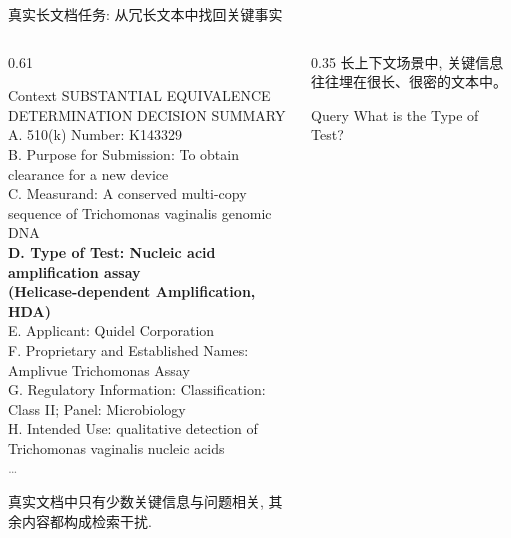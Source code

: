 



\begin{frame}
  \titlepage
\end{frame}

\begin{frame}{真实长文档任务: 从冗长文本中找回关键事实}
  \centering
  \begin{minipage}{0.92\textwidth}
  \small
  \begin{columns}[T,onlytextwidth]
    \begin{column}{0.61\linewidth}
      \begin{block}{Context}
        {\fontsize{5.4pt}{6.5pt}\selectfont\ttfamily
        SUBSTANTIAL EQUIVALENCE DETERMINATION DECISION SUMMARY\\
        A. 510(k) Number: K143329\\
        B. Purpose for Submission: To obtain clearance for a new device\\
        C. Measurand: A conserved multi-copy sequence of Trichomonas vaginalis genomic DNA\\
        \textcolor{scured}{\textbf{D. Type of Test: Nucleic acid amplification assay}}\\
        \textcolor{scured}{\textbf{\quad (Helicase-dependent Amplification, HDA)}}\\
        E. Applicant: Quidel Corporation\\
        F. Proprietary and Established Names: Amplivue Trichomonas Assay\\
        G. Regulatory Information: Classification: Class II; Panel: Microbiology\\
        H. Intended Use: qualitative detection of Trichomonas vaginalis nucleic acids\\
        \hfill\textcolor{gray}{\ldots}
        }
      \end{block}
      \vskip0.18cm
      {\footnotesize\color{gray}真实文档中只有少数关键信息与问题相关, 其余内容都构成检索干扰.}
    \end{column}

    \begin{column}{0.35\linewidth}
      \vskip0.08cm
      长上下文场景中, 关键信息往往埋在很长、很密的文本中。

      \vskip0.35cm
      \begin{block}{Query}
        \centering
        \large What is the Type of Test?
      \end{block}


\end{column}
\end{columns}
\end{minipage}
\end{frame}
